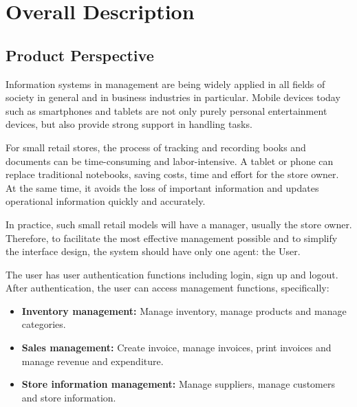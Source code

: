 \documentclass[../thesis.tex]{subfiles}
\begin{document}
\section{Overall Description}
\subsection{Product Perspective}

Information systems in management are being widely applied in all fields of society in general and in business industries in particular. Mobile devices today such as smartphones and tablets are not only purely personal entertainment devices, but also provide strong support in handling tasks.

For small retail stores, the process of tracking and recording books and documents can be time-consuming and labor-intensive. A tablet or phone can replace traditional notebooks, saving costs, time and effort for the store owner. At the same time, it avoids the loss of important information and updates operational information quickly and accurately.


In practice, such small retail models will have a manager, usually the store owner. Therefore, to facilitate the most effective management possible and to simplify the interface design, the system should have only one agent: the User.

The user has user authentication functions including login, sign up and logout. After authentication, the user can access management functions, specifically:
\begin{itemize}
    \item[]\textbf{ Inventory management: }Manage inventory, manage products and manage categories.
    \item[]\textbf{ Sales management: }Create invoice, manage invoices, print invoices and manage revenue and expenditure.
    \item[]\textbf{ Store information management:} Manage suppliers, manage customers and store information.

\end{itemize}
\end{document}
